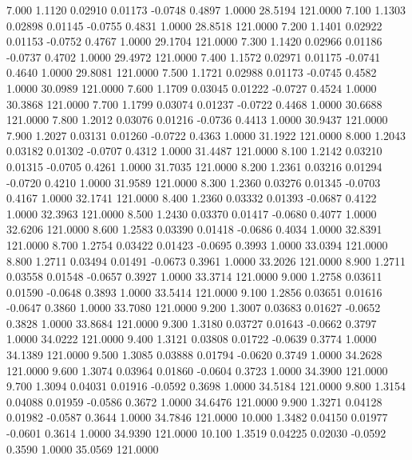    7.000   1.1120   0.02910   0.01173  -0.0748   0.4897   1.0000  28.5194 121.0000
   7.100   1.1303   0.02898   0.01145  -0.0755   0.4831   1.0000  28.8518 121.0000
   7.200   1.1401   0.02922   0.01153  -0.0752   0.4767   1.0000  29.1704 121.0000
   7.300   1.1420   0.02966   0.01186  -0.0737   0.4702   1.0000  29.4972 121.0000
   7.400   1.1572   0.02971   0.01175  -0.0741   0.4640   1.0000  29.8081 121.0000
   7.500   1.1721   0.02988   0.01173  -0.0745   0.4582   1.0000  30.0989 121.0000
   7.600   1.1709   0.03045   0.01222  -0.0727   0.4524   1.0000  30.3868 121.0000
   7.700   1.1799   0.03074   0.01237  -0.0722   0.4468   1.0000  30.6688 121.0000
   7.800   1.2012   0.03076   0.01216  -0.0736   0.4413   1.0000  30.9437 121.0000
   7.900   1.2027   0.03131   0.01260  -0.0722   0.4363   1.0000  31.1922 121.0000
   8.000   1.2043   0.03182   0.01302  -0.0707   0.4312   1.0000  31.4487 121.0000
   8.100   1.2142   0.03210   0.01315  -0.0705   0.4261   1.0000  31.7035 121.0000
   8.200   1.2361   0.03216   0.01294  -0.0720   0.4210   1.0000  31.9589 121.0000
   8.300   1.2360   0.03276   0.01345  -0.0703   0.4167   1.0000  32.1741 121.0000
   8.400   1.2360   0.03332   0.01393  -0.0687   0.4122   1.0000  32.3963 121.0000
   8.500   1.2430   0.03370   0.01417  -0.0680   0.4077   1.0000  32.6206 121.0000
   8.600   1.2583   0.03390   0.01418  -0.0686   0.4034   1.0000  32.8391 121.0000
   8.700   1.2754   0.03422   0.01423  -0.0695   0.3993   1.0000  33.0394 121.0000
   8.800   1.2711   0.03494   0.01491  -0.0673   0.3961   1.0000  33.2026 121.0000
   8.900   1.2711   0.03558   0.01548  -0.0657   0.3927   1.0000  33.3714 121.0000
   9.000   1.2758   0.03611   0.01590  -0.0648   0.3893   1.0000  33.5414 121.0000
   9.100   1.2856   0.03651   0.01616  -0.0647   0.3860   1.0000  33.7080 121.0000
   9.200   1.3007   0.03683   0.01627  -0.0652   0.3828   1.0000  33.8684 121.0000
   9.300   1.3180   0.03727   0.01643  -0.0662   0.3797   1.0000  34.0222 121.0000
   9.400   1.3121   0.03808   0.01722  -0.0639   0.3774   1.0000  34.1389 121.0000
   9.500   1.3085   0.03888   0.01794  -0.0620   0.3749   1.0000  34.2628 121.0000
   9.600   1.3074   0.03964   0.01860  -0.0604   0.3723   1.0000  34.3900 121.0000
   9.700   1.3094   0.04031   0.01916  -0.0592   0.3698   1.0000  34.5184 121.0000
   9.800   1.3154   0.04088   0.01959  -0.0586   0.3672   1.0000  34.6476 121.0000
   9.900   1.3271   0.04128   0.01982  -0.0587   0.3644   1.0000  34.7846 121.0000
  10.000   1.3482   0.04150   0.01977  -0.0601   0.3614   1.0000  34.9390 121.0000
  10.100   1.3519   0.04225   0.02030  -0.0592   0.3590   1.0000  35.0569 121.0000
